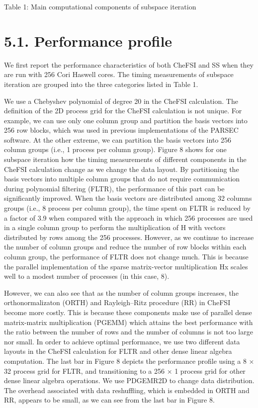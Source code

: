 \documentclass[
  10
]{article}
\begin{document}
Table 1: Main computational components of subspace iteration

\section{5.1. Performance profile}\label{performance-profile}

We first report the performance characteristics of both CheFSI and SS
when they are run with 256 Cori Haswell cores. The timing measurements
of subspace iteration are grouped into the three categories listed in
Table 1.

We use a Chebyshev polynomial of degree 20 in the CheFSI calculation.
The definition of the 2D process grid for the CheFSI calculation is not
unique. For example, we can use only one column group and partition the
basis vectors into 256 row blocks, which was used in previous
implementations of the PARSEC software. At the other extreme, we can
partition the basis vectors into 256 column groups (i.e., 1 process per
column group). Figure 8 shows for one subspace iteration how the timing
measurements of different components in the CheFSI calculation change as
we change the data layout. By partitioning the basis vectors into
multiple column groups that do not require communication during
polynomial filtering (FLTR), the performance of this part can be
significantly improved. When the basis vectors are distributed among 32
columns groups (i.e., 8 process per column group), the time spent on
FLTR is reduced by a factor of 3.9 when compared with the approach in
which 256 processes are used in a single column group to perform the
multiplication of H with vectors distributed by rows among the 256
processes. However, as we continue to increase the number of column
groups and reduce the number of row blocks within each column group, the
performance of FLTR does not change much. This is because the parallel
implementation of the sparse matrix-vector multiplication Hx scales well
to a modest number of processes (in this case, 8).

However, we can also see that as the number of column groups increases,
the orthonormalizaton (ORTH) and Rayleigh--Ritz procedure (RR) in CheFSI
become more costly. This is because these components make use of
parallel dense matrix-matrix multiplication (PGEMM) which attains the
best performance with the ratio between the number of rows and the
number of columns is not too large nor small. In order to achieve
optimal performance, we use two different data layouts in the CheFSI
calculation for FLTR and other dense linear algebra computation. The
last bar in Figure 8 depicts the performance profile using a 8 × 32
process grid for FLTR, and transitioning to a 256 × 1 process grid for
other dense linear algebra operations. We use PDGEMR2D to change data
distribution. The overhead associated with data reshuffling, which is
embedded in ORTH and RR, appears to be small, as we can see from the
last bar in Figure 8.
\end{document}

